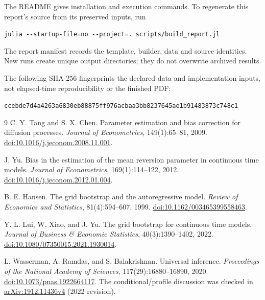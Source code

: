 \documentclass[11pt]{article}
\begin{document}
The README gives installation and execution commands. To regenerate this report's
source from its preserved inputs, run
\begin{center}\small\verb|julia --startup-file=no --project=. scripts/build_report.jl|\end{center}
The report manifest records the template, builder, data and source identities.
New runs create unique output directories; they do not overwrite archived results.
\begin{samepage}
The following SHA-256 fingerprints the declared data and implementation inputs,
not elapsed-time reproducibility or the finished PDF:
\begin{center}\footnotesize\texttt{ccebde7d4a4263a6830eb88875ff976acbaa3bb8237645ae1b91483873c748c1}\end{center}
\end{samepage}

\begin{thebibliography}{9}
C. Y. Tang and S. X. Chen.
Parameter estimation and bias correction for diffusion processes.
\emph{Journal of Econometrics}, 149(1):65--81, 2009.
\href{https://doi.org/10.1016/j.jeconom.2008.11.001}{doi:10.1016/j.jeconom.2008.11.001}.

J. Yu.
Bias in the estimation of the mean reversion parameter in continuous time models.
\emph{Journal of Econometrics}, 169(1):114--122, 2012.
\href{https://doi.org/10.1016/j.jeconom.2012.01.004}{doi:10.1016/j.jeconom.2012.01.004}.

B. E. Hansen.
The grid bootstrap and the autoregressive model.
\emph{Review of Economics and Statistics}, 81(4):594--607, 1999.
\href{https://doi.org/10.1162/003465399558463}{doi:10.1162/003465399558463}.

Y. L. Lui, W. Xiao, and J. Yu.
The grid bootstrap for continuous time models.
\emph{Journal of Business \& Economic Statistics}, 40(3):1390--1402, 2022.
\href{https://doi.org/10.1080/07350015.2021.1930014}{doi:10.1080/07350015.2021.1930014}.

L. Wasserman, A. Ramdas, and S. Balakrishnan.
Universal inference.
\emph{Proceedings of the National Academy of Sciences}, 117(29):16880--16890, 2020.
\href{https://doi.org/10.1073/pnas.1922664117}{doi:10.1073/pnas.1922664117}.
The conditional/profile discussion was checked in
\href{https://arxiv.org/abs/1912.11436v4}{arXiv:1912.11436v4} (2022 revision).
\end{thebibliography}
\end{document}
